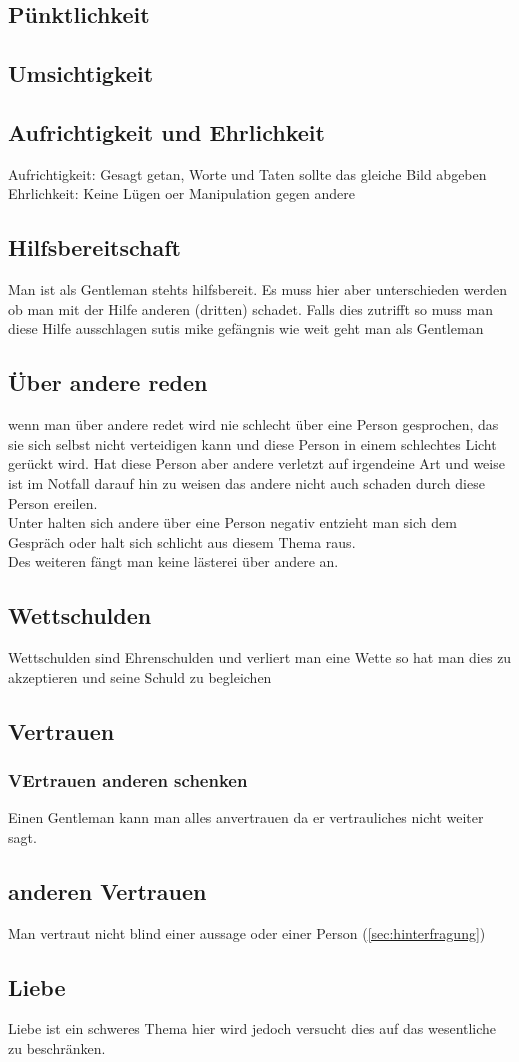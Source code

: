         \subsection{Pünktlichkeit}
        \subsection{Umsichtigkeit}
        \subsection{Aufrichtigkeit und Ehrlichkeit}
            Aufrichtigkeit: Gesagt getan, Worte und Taten sollte das gleiche Bild abgeben
            Ehrlichkeit: Keine Lügen oer Manipulation gegen andere 
        \subsection{Hilfsbereitschaft}
            Man ist als Gentleman stehts hilfsbereit. Es muss hier aber unterschieden werden ob man mit der Hilfe anderen (dritten) schadet. Falls dies zutrifft so muss man diese Hilfe ausschlagen {\color{red}sutis mike gefängnis}
            wie weit geht man als Gentleman 
        \subsection{Über andere reden}
            wenn man über andere redet wird nie schlecht über eine Person gesprochen, das sie sich selbst nicht verteidigen kann und diese Person in einem schlechtes Licht gerückt wird. Hat diese Person aber andere verletzt auf irgendeine Art und weise ist im Notfall darauf hin zu weisen das andere nicht auch schaden durch diese Person ereilen. \\
            Unter halten sich andere über eine Person negativ entzieht man sich dem Gespräch oder halt sich schlicht aus diesem Thema raus. \\
            Des weiteren fängt man keine lästerei über andere an. 
        \subsection{Wettschulden}  
            Wettschulden sind Ehrenschulden und verliert man eine Wette so hat man dies zu akzeptieren und seine Schuld zu begleichen 
        \subsection{Vertrauen}
            \subsubsection{VErtrauen anderen schenken}
                Einen Gentleman kann man alles anvertrauen da er vertrauliches nicht weiter sagt.
            \subsection{anderen Vertrauen}  
                Man vertraut nicht blind einer aussage oder einer Person (\ref{sec:hinterfragung})
        \subsection{Liebe}
            Liebe ist ein schweres Thema hier wird jedoch versucht dies auf das wesentliche zu beschränken. 
        

    
